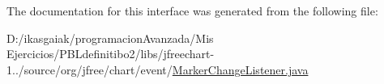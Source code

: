 The documentation for this interface was generated from the following file\+:\begin{DoxyCompactItemize}
\item 
D\+:/ikasgaiak/programacion\+Avanzada/\+Mis Ejercicios/\+P\+B\+Ldefinitibo2/libs/jfreechart-\/1../source/org/jfree/chart/event/\mbox{\hyperlink{_marker_change_listener_8java}{Marker\+Change\+Listener.\+java}}\end{DoxyCompactItemize}
